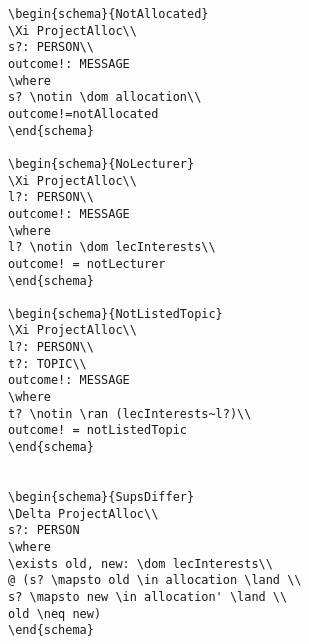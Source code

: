 \begin{verbatim}
\begin{schema}{NotAllocated}
\Xi ProjectAlloc\\
s?: PERSON\\
outcome!: MESSAGE
\where
s? \notin \dom allocation\\
outcome!=notAllocated
\end{schema}

\begin{schema}{NoLecturer}
\Xi ProjectAlloc\\
l?: PERSON\\
outcome!: MESSAGE
\where
l? \notin \dom lecInterests\\
outcome! = notLecturer
\end{schema}

\begin{schema}{NotListedTopic}
\Xi ProjectAlloc\\
l?: PERSON\\
t?: TOPIC\\
outcome!: MESSAGE
\where
t? \notin \ran (lecInterests~l?)\\
outcome! = notListedTopic
\end{schema}


\begin{schema}{SupsDiffer}
\Delta ProjectAlloc\\
s?: PERSON
\where
\exists old, new: \dom lecInterests\\
@ (s? \mapsto old \in allocation \land \\
s? \mapsto new \in allocation' \land \\
old \neq new)
\end{schema}


\end{verbatim}